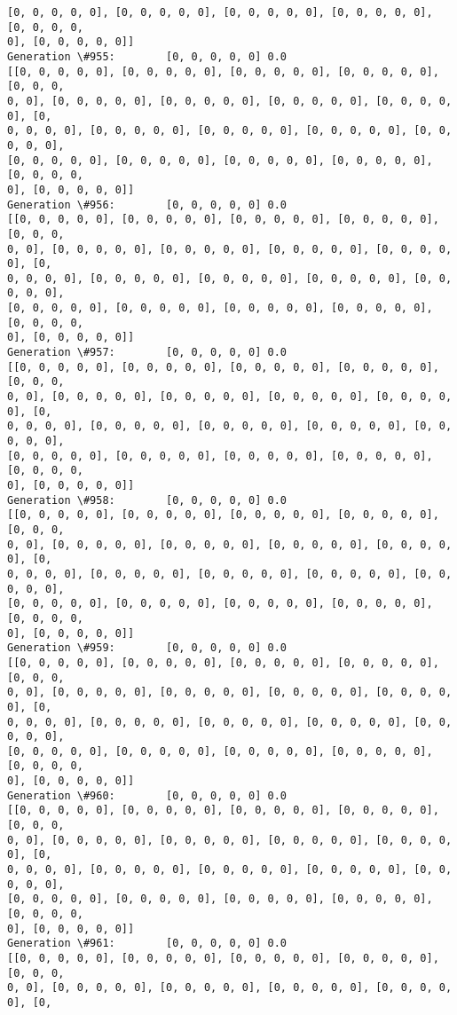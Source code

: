\documentclass[11pt]{article}
\begin{document}
\begin{Verbatim}[commandchars=\\\{\}]
[0, 0, 0, 0, 0], [0, 0, 0, 0, 0], [0, 0, 0, 0, 0], [0, 0, 0, 0, 0], [0, 0, 0, 0,
0], [0, 0, 0, 0, 0]]
Generation \#955:        [0, 0, 0, 0, 0] 0.0
[[0, 0, 0, 0, 0], [0, 0, 0, 0, 0], [0, 0, 0, 0, 0], [0, 0, 0, 0, 0], [0, 0, 0,
0, 0], [0, 0, 0, 0, 0], [0, 0, 0, 0, 0], [0, 0, 0, 0, 0], [0, 0, 0, 0, 0], [0,
0, 0, 0, 0], [0, 0, 0, 0, 0], [0, 0, 0, 0, 0], [0, 0, 0, 0, 0], [0, 0, 0, 0, 0],
[0, 0, 0, 0, 0], [0, 0, 0, 0, 0], [0, 0, 0, 0, 0], [0, 0, 0, 0, 0], [0, 0, 0, 0,
0], [0, 0, 0, 0, 0]]
Generation \#956:        [0, 0, 0, 0, 0] 0.0
[[0, 0, 0, 0, 0], [0, 0, 0, 0, 0], [0, 0, 0, 0, 0], [0, 0, 0, 0, 0], [0, 0, 0,
0, 0], [0, 0, 0, 0, 0], [0, 0, 0, 0, 0], [0, 0, 0, 0, 0], [0, 0, 0, 0, 0], [0,
0, 0, 0, 0], [0, 0, 0, 0, 0], [0, 0, 0, 0, 0], [0, 0, 0, 0, 0], [0, 0, 0, 0, 0],
[0, 0, 0, 0, 0], [0, 0, 0, 0, 0], [0, 0, 0, 0, 0], [0, 0, 0, 0, 0], [0, 0, 0, 0,
0], [0, 0, 0, 0, 0]]
Generation \#957:        [0, 0, 0, 0, 0] 0.0
[[0, 0, 0, 0, 0], [0, 0, 0, 0, 0], [0, 0, 0, 0, 0], [0, 0, 0, 0, 0], [0, 0, 0,
0, 0], [0, 0, 0, 0, 0], [0, 0, 0, 0, 0], [0, 0, 0, 0, 0], [0, 0, 0, 0, 0], [0,
0, 0, 0, 0], [0, 0, 0, 0, 0], [0, 0, 0, 0, 0], [0, 0, 0, 0, 0], [0, 0, 0, 0, 0],
[0, 0, 0, 0, 0], [0, 0, 0, 0, 0], [0, 0, 0, 0, 0], [0, 0, 0, 0, 0], [0, 0, 0, 0,
0], [0, 0, 0, 0, 0]]
Generation \#958:        [0, 0, 0, 0, 0] 0.0
[[0, 0, 0, 0, 0], [0, 0, 0, 0, 0], [0, 0, 0, 0, 0], [0, 0, 0, 0, 0], [0, 0, 0,
0, 0], [0, 0, 0, 0, 0], [0, 0, 0, 0, 0], [0, 0, 0, 0, 0], [0, 0, 0, 0, 0], [0,
0, 0, 0, 0], [0, 0, 0, 0, 0], [0, 0, 0, 0, 0], [0, 0, 0, 0, 0], [0, 0, 0, 0, 0],
[0, 0, 0, 0, 0], [0, 0, 0, 0, 0], [0, 0, 0, 0, 0], [0, 0, 0, 0, 0], [0, 0, 0, 0,
0], [0, 0, 0, 0, 0]]
Generation \#959:        [0, 0, 0, 0, 0] 0.0
[[0, 0, 0, 0, 0], [0, 0, 0, 0, 0], [0, 0, 0, 0, 0], [0, 0, 0, 0, 0], [0, 0, 0,
0, 0], [0, 0, 0, 0, 0], [0, 0, 0, 0, 0], [0, 0, 0, 0, 0], [0, 0, 0, 0, 0], [0,
0, 0, 0, 0], [0, 0, 0, 0, 0], [0, 0, 0, 0, 0], [0, 0, 0, 0, 0], [0, 0, 0, 0, 0],
[0, 0, 0, 0, 0], [0, 0, 0, 0, 0], [0, 0, 0, 0, 0], [0, 0, 0, 0, 0], [0, 0, 0, 0,
0], [0, 0, 0, 0, 0]]
Generation \#960:        [0, 0, 0, 0, 0] 0.0
[[0, 0, 0, 0, 0], [0, 0, 0, 0, 0], [0, 0, 0, 0, 0], [0, 0, 0, 0, 0], [0, 0, 0,
0, 0], [0, 0, 0, 0, 0], [0, 0, 0, 0, 0], [0, 0, 0, 0, 0], [0, 0, 0, 0, 0], [0,
0, 0, 0, 0], [0, 0, 0, 0, 0], [0, 0, 0, 0, 0], [0, 0, 0, 0, 0], [0, 0, 0, 0, 0],
[0, 0, 0, 0, 0], [0, 0, 0, 0, 0], [0, 0, 0, 0, 0], [0, 0, 0, 0, 0], [0, 0, 0, 0,
0], [0, 0, 0, 0, 0]]
Generation \#961:        [0, 0, 0, 0, 0] 0.0
[[0, 0, 0, 0, 0], [0, 0, 0, 0, 0], [0, 0, 0, 0, 0], [0, 0, 0, 0, 0], [0, 0, 0,
0, 0], [0, 0, 0, 0, 0], [0, 0, 0, 0, 0], [0, 0, 0, 0, 0], [0, 0, 0, 0, 0], [0,

\end{Verbatim}
\end{document}
